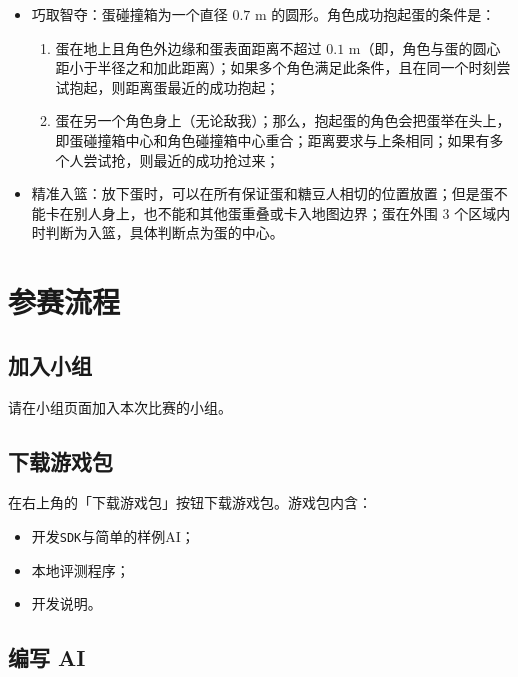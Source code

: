 \documentclass[UTF8]{article}
\begin{document}
\begin{itemize}
\item
  巧取智夺：蛋碰撞箱为一个直径 \(0.7\text{ m}\)
  的圆形。角色成功抱起蛋的条件是：

  \begin{enumerate}
  \def\labelenumi{\arabic{enumi}.}
  \item
    蛋在地上且角色外边缘和蛋表面距离不超过
    \(0.1\text{ m}\)（即，角色与蛋的圆心距小于半径之和加此距离）；如果多个角色满足此条件，且在同一个时刻尝试抱起，则距离蛋最近的成功抱起；
  \item
    蛋在另一个角色身上（无论敌我）；那么，抱起蛋的角色会把蛋举在头上，即蛋碰撞箱中心和角色碰撞箱中心重合；距离要求与上条相同；如果有多个人尝试抢，则最近的成功抢过来；
  \end{enumerate}
\item
  精准入篮：放下蛋时，可以在所有保证蛋和糖豆人相切的位置放置；但是蛋不能卡在别人身上，也不能和其他蛋重叠或卡入地图边界；蛋在外围
  \(3\) 个区域内时判断为入篮，具体判断点为蛋的中心。
\end{itemize}

\hypertarget{header-n26}{%
\section{参赛流程}\label{header-n26}}

\hypertarget{header-n27}{%
\subsection{加入小组}\label{header-n27}}

请在小组页面加入本次比赛的小组。

\hypertarget{header-n29}{%
\subsection{下载游戏包}\label{header-n29}}

在右上角的「下载游戏包」按钮下载游戏包。游戏包内含：

\begin{itemize}
\item
  开发\texttt{SDK}与简单的样例AI；
\item
  本地评测程序；
\item
  开发说明。
\end{itemize}

\hypertarget{header-n39}{%
\subsection{编写 AI}\label{header-n39}}
\end{document}
